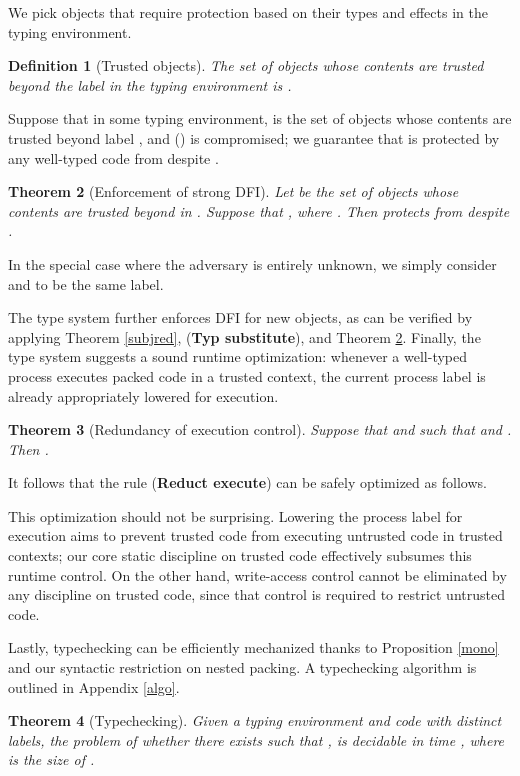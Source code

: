 \documentclass{sigplanconf}
\newcommand{\trule}[1]{(\textbf{Typ #1})}
\newcommand{\rrule}[1]{\textbf{Reduct #1}}
\newtheorem{definition}{Definition}[section]
\newtheorem{theorem}[definition]{Theorem}
\begin{document}
We pick objects that require protection based on their types and effects in the typing environment.
\begin{definition}[Trusted objects] The set of objects whose contents are trusted beyond the label  in the typing environment  is .
\end{definition}
Suppose that in some typing environment,  is the set of objects whose contents are trusted beyond label , and  () is compromised; we guarantee that  is protected by any well-typed code from  despite .
\begin{theorem}[Enforcement of strong DFI]\label{mainthm} Let
   be the set of objects whose contents are trusted beyond  in . Suppose that , where . Then 
  protects  from  despite . 
\end{theorem}
In the special case where the adversary is entirely unknown, we simply consider  and  to be the same label. 

The type system further enforces DFI for new objects, as can be verified by applying Theorem \ref{subjred}, \trule{substitute}, and Theorem \ref{mainthm}. 
Finally, the type system suggests a sound runtime optimization:
whenever a well-typed process executes packed code in a trusted context, the current process label is already appropriately lowered for execution. 
\begin{theorem}[Redundancy of execution control]\label{optim} Suppose that  and  
 such that  and . Then . \end{theorem}
It follows that the rule (\rrule{execute}) can be safely optimized as follows.

This optimization should not be surprising. Lowering the process label for execution aims to prevent trusted code from executing untrusted code in trusted contexts; our core static discipline on trusted code effectively subsumes this runtime control. 
 On the other hand, write-access control cannot be eliminated by any discipline on trusted code, since that control is required to restrict untrusted code. 

Lastly, typechecking can be efficiently mechanized thanks to Proposition \ref{mono} and our syntactic restriction on nested packing. 
A typechecking algorithm is outlined in Appendix \ref{algo}.
\begin{theorem}[Typechecking]\label{decide} Given a typing environment  and code  with  distinct labels, the problem of whether there exists  such that , is decidable in time , where  is the size of .
\end{theorem}
\end{document}
